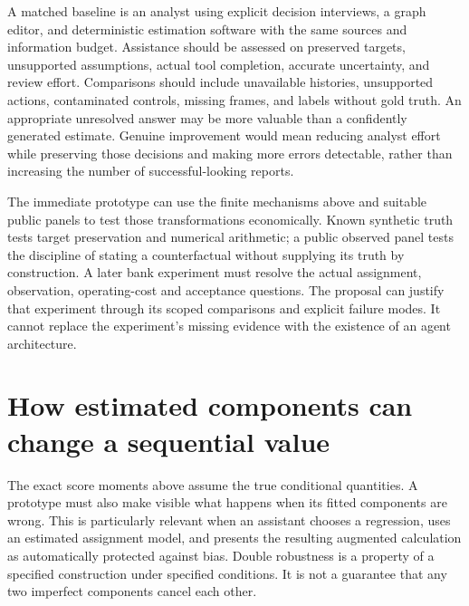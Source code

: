 A matched baseline is an analyst using explicit decision interviews, a graph
editor, and deterministic estimation software with the same sources and
information budget. Assistance should be assessed on preserved targets,
unsupported assumptions, actual tool completion, accurate uncertainty, and
review effort. Comparisons should include unavailable histories, unsupported
actions, contaminated controls, missing frames, and labels without gold truth.
An appropriate unresolved answer may be more valuable than a confidently
generated estimate. Genuine improvement would mean reducing analyst effort
while preserving those decisions and making more errors detectable, rather
than increasing the number of successful-looking reports.

The immediate prototype can use the finite mechanisms above and suitable
public panels to test those transformations economically. Known synthetic
truth tests target preservation and numerical arithmetic; a public observed
panel tests the discipline of stating a counterfactual without supplying its
truth by construction. A later bank experiment must resolve the actual
assignment, observation, operating-cost and acceptance questions. The proposal
can justify that experiment through its scoped comparisons and explicit
failure modes. It cannot replace the experiment's missing evidence with the
existence of an agent architecture.
\label{exec14:l5-development-end}


\section{How estimated components can change a sequential value}
\label{exec14:l5-remainder}

The exact score moments above assume the true conditional quantities. A
prototype must also make visible what happens when its fitted components are
wrong. This is particularly relevant when an assistant chooses a regression,
uses an estimated assignment model, and presents the resulting augmented
calculation as automatically protected against bias. Double robustness is a
property of a specified construction under specified conditions. It is not a
guarantee that any two imperfect components cancel each other.

